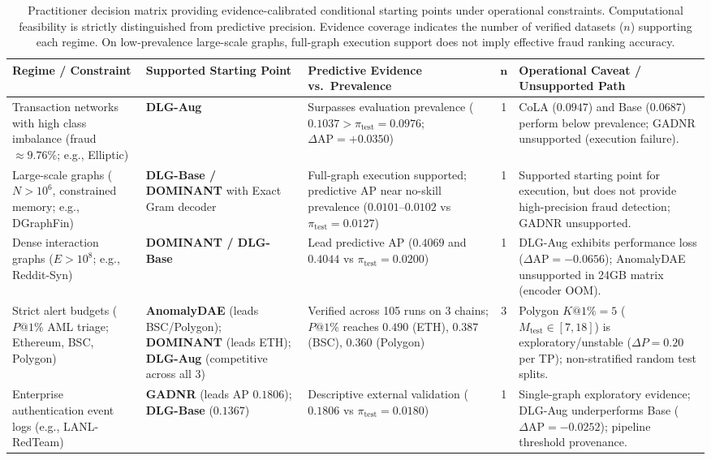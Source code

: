 \documentclass[11pt,a4paper]{article}
\begin{document}
\begin{table}[htbp]
\centering\fontsize{7.2pt}{8.5pt}\selectfont\setlength{\tabcolsep}{2.5pt}
\caption{Practitioner decision matrix providing evidence-calibrated conditional starting points under operational constraints. Computational feasibility is strictly distinguished from predictive precision. Evidence coverage indicates the number of verified datasets ($n$) supporting each regime. On low-prevalence large-scale graphs, full-graph execution support does not imply effective fraud ranking accuracy.}
\label{tab:decision_matrix}
\begin{tabularx}{\textwidth}{>{\raggedright\arraybackslash}p{}>{\raggedright\arraybackslash}p{}>{\raggedright\arraybackslash}Xc>{\raggedright\arraybackslash}p{}}\toprule
\textbf{Regime / Constraint} & \textbf{Supported Starting Point} & \textbf{Predictive Evidence vs.\ Prevalence} & $\mathbf{n}$ & \textbf{Operational Caveat / Unsupported Path} \\\midrule
Transaction networks with high class imbalance (fraud $\approx 9.76\%$; e.g., Elliptic) & \textbf{DLG-Aug} & Surpasses evaluation prevalence ($0.1037 > \pi_{\mathrm{test}}=0.0976$; $\Delta\mathrm{AP}=+0.0350$) & 1 & CoLA ($0.0947$) and Base ($0.0687$) perform below prevalence; GADNR unsupported (execution failure). \\
Large-scale graphs ($N > 10^6$, constrained memory; e.g., DGraphFin) & \textbf{DLG-Base / DOMINANT} with Exact Gram decoder & Full-graph execution supported; predictive AP near no-skill prevalence ($0.0101$--$0.0102$ vs $\pi_{\mathrm{test}}=0.0127$) & 1 & Supported starting point for execution, but does not provide high-precision fraud detection; GADNR unsupported. \\
Dense interaction graphs ($E > 10^8$; e.g., Reddit-Syn) & \textbf{DOMINANT / DLG-Base} & Lead predictive AP ($0.4069$ and $0.4044$ vs $\pi_{\mathrm{test}}=0.0200$) & 1 & DLG-Aug exhibits performance loss ($\Delta\mathrm{AP}=-0.0656$); AnomalyDAE unsupported in 24GB matrix (encoder OOM). \\
Strict alert budgets ($P@1\%$ AML triage; Ethereum, BSC, Polygon) & \textbf{AnomalyDAE} (leads BSC/Polygon); \textbf{DOMINANT} (leads ETH); \textbf{DLG-Aug} (competitive across all 3) & Verified across 105 runs on 3 chains; $P@1\%$ reaches $0.490$ (ETH), $0.387$ (BSC), $0.360$ (Polygon) & 3 & Polygon $K@1\%=5$ ($M_{\mathrm{test}} \in [7, 18]$) is exploratory/unstable ($\Delta P = 0.20$ per TP); non-stratified random test splits. \\
Enterprise authentication event logs (e.g., LANL-RedTeam) & \textbf{GADNR} (leads AP $0.1806$); \textbf{DLG-Base} ($0.1367$) & Descriptive external validation ($0.1806$ vs $\pi_{\mathrm{test}}=0.0180$) & 1 & Single-graph exploratory evidence; DLG-Aug underperforms Base ($\Delta\mathrm{AP}=-0.0252$); pipeline threshold provenance. \\\bottomrule
\end{tabularx}
\end{table}
\end{document}
